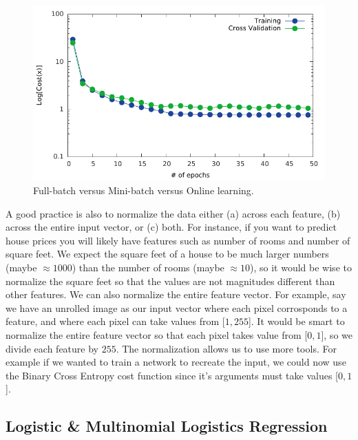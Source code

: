 \documentclass[11pt]{article}
\begin{document}
\begin{figure}[H]
  \centering
  \includegraphics[width=0.5\linewidth]{epoch_mlp}
  \caption{Full-batch versus Mini-batch versus Online learning.}
  \label{fig:learning_size}
\end{figure}


A good practice is also to normalize the data either (a) across each feature, (b) across the entire input vector, or (c) both. For instance, if you want to predict house prices you will likely have features such as number of rooms and number of square feet. We expect the square feet of a house to be much larger numbers (maybe $\approx 1000$) than the number of rooms (maybe $\approx 10$), so it would be wise to normalize the square feet so that the values are not magnitudes different than other features. We can also normalize the entire feature vector. For example, say we have an unrolled image as our input vector where each pixel corrosponds to a feature, and where each pixel can take values from [$1,255$]. It would be smart to normalize the entire feature vector so that each pixel takes value from [$0,1$], so we divide each feature by $255$. The normalization allows us to use more tools. For example if we wanted to train a network to recreate the input, we could now use the Binary Cross Entropy cost function since it's arguments must take values [$0,1$].

\subsection{Logistic \& Multinomial Logistics Regression}
\end{document}
